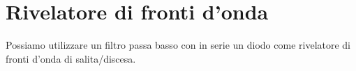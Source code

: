 \section{Rivelatore di fronti d'onda}

Possiamo utilizzare un filtro passa basso con in serie un diodo come rivelatore di fronti d'onda di salita/discesa.
